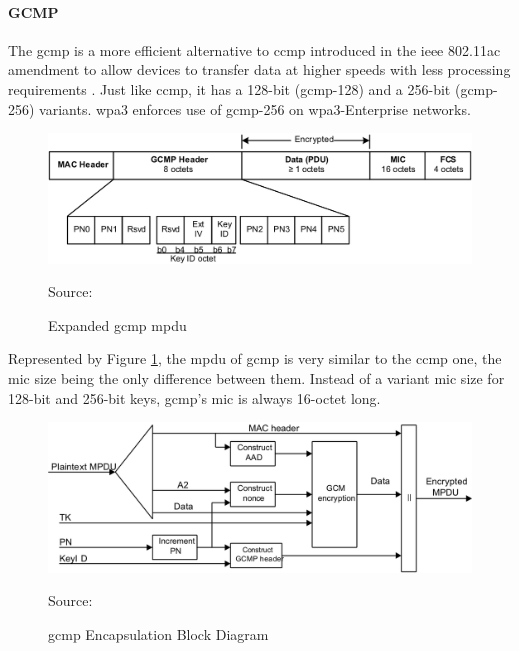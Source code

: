 \paragraph{GCMP}

The \gls{gcmp} is a more efficient alternative to \gls{ccmp} introduced in the \gls{ieee} 802.11ac amendment to allow devices to transfer data at higher speeds with less processing requirements \cite{ieee_80211_2020}. Just like \gls{ccmp}, it has a 128-bit (\gls{gcmp}-128) and a 256-bit (\gls{gcmp}-256) variants. \gls{wpa}3 enforces use of \gls{gcmp}-256 on \gls{wpa}3-Enterprise networks.

\begin{figure}[h]
    \centering
    \includegraphics[width=\linewidth]{contents/background-in-wireless-networks/protected-network-standards/wpa3/gcmp/expanded-gcmp-mpdu.png}
    \caption{Expanded \gls{gcmp} \gls{mpdu}}
    {Source: \cite{ieee_80211_2020}}
    \label{figure:ieee80211_figure1226}
\end{figure}

Represented by Figure \ref{figure:ieee80211_figure1226}, the \gls{mpdu} of \gls{gcmp} is very similar to the \gls{ccmp} one, the \gls{mic} size being the only difference between them. Instead of a variant \gls{mic} size for 128-bit and 256-bit keys, \gls{gcmp}’s \gls{mic} is always 16-octet long.

\begin{figure}[h]
    \centering
    \includegraphics[width=\linewidth]{contents/background-in-wireless-networks/protected-network-standards/wpa3/gcmp/gcmp-encapsulation-block-diagram.png}
    \caption{\gls{gcmp} Encapsulation Block Diagram}
    {Source: \cite{ieee_80211_2020}}
    \label{figure:ieee80211_figure1227}
\end{figure}

